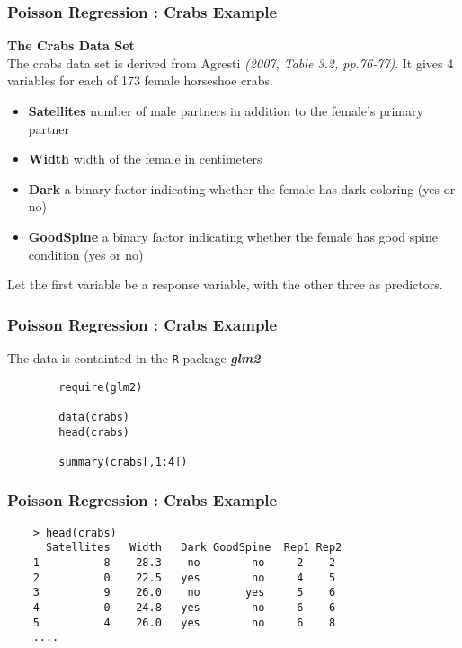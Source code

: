 \documentclass[MASTER.tex]{subfiles}
\begin{document}
\begin{frame}[fragile]
	\frametitle{Poisson Regression :  Crabs Example}
	\textbf{The Crabs Data Set}\\
	The crabs data set is derived from Agresti \textit{(2007, Table 3.2, pp.76-77)}. It gives 4 variables for each of 173 female horseshoe crabs.
	\begin{itemize}
		\item \textbf{Satellites}
		number of male partners in addition to the female's primary partner
		
		\item \textbf{Width}
		width of the female in centimeters
		
		\item \textbf{Dark}
		a binary factor indicating whether the female has dark coloring (yes or no)
		
		\item \textbf{GoodSpine}
		a binary factor indicating whether the female has good spine condition (yes or no)
	\end{itemize} \smallskip
	\noindent Let the first variable be a response variable, with the other three as predictors.
\end{frame}
\begin{frame}[fragile]
	\frametitle{Poisson Regression :  Crabs Example}
	\large
	The data is containted in the \texttt{R} package \textbf{\textit{glm2}}
	\begin{framed}
		\begin{verbatim}
		require(glm2)
		
		data(crabs)
		head(crabs)
		
		summary(crabs[,1:4])
		\end{verbatim}
	\end{framed}
\end{frame}
\begin{frame}[fragile]
	\frametitle{Poisson Regression :  Crabs Example}
	\large
	\begin{verbatim}
	> head(crabs)
	  Satellites   Width   Dark GoodSpine  Rep1 Rep2
	1          8    28.3    no        no     2    2
	2          0    22.5   yes        no     4    5
	3          9    26.0    no       yes     5    6
	4          0    24.8   yes        no     6    6
	5          4    26.0   yes        no     6    8
	....
	\end{verbatim}
\end{frame}
\end{document}
